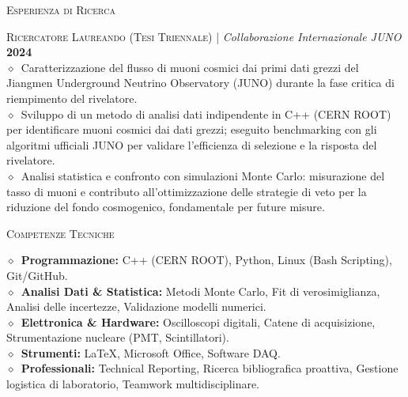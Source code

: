 \documentclass[11pt, a4paper]{article}
\newcommand{\dates}[1]{\hfill\mbox{\textbf{#1}}}
\newcommand{\smaller}[1]{{\small$\diamond$\ #1}}
\newcommand{\headright}[1]{\vspace*{2.5ex}\textsc{\Large\color{cvblue}#1}\par%
     \vspace*{-2ex}{\color{cvblue}\hrulefill}\par}
\begin{document}
\begin{minipage}[t]{0.56\textwidth}
\headright{Esperienza di Ricerca}
\textsc{Ricercatore Laureando (Tesi Triennale)} | \textit{Collaborazione Internazionale JUNO} \dates{2024} \\
\smaller{Caratterizzazione del flusso di muoni cosmici dai primi dati grezzi del Jiangmen Underground Neutrino Observatory (JUNO) durante la fase critica di riempimento del rivelatore.}\\
\smaller{Sviluppo di un metodo di analisi dati indipendente in C++ (CERN ROOT) per identificare muoni cosmici dai dati grezzi; eseguito benchmarking con gli algoritmi ufficiali JUNO per validare l'efficienza di selezione e la risposta del rivelatore.}\\
\smaller{Analisi statistica e confronto con simulazioni Monte Carlo: misurazione del tasso di muoni e contributo all'ottimizzazione delle strategie di veto per la riduzione del fondo cosmogenico, fondamentale per future misure.}

\headright{Competenze Tecniche}

\smaller{\textbf{Programmazione:} C++ (CERN ROOT), Python, Linux (Bash Scripting), Git/GitHub.} \\
\smaller{\textbf{Analisi Dati \& Statistica:} Metodi Monte Carlo, Fit di verosimiglianza, Analisi delle incertezze, Validazione modelli numerici.} \\
\smaller{\textbf{Elettronica \& Hardware:} Oscilloscopi digitali, Catene di acquisizione, Strumentazione nucleare (PMT, Scintillatori).} \\
\smaller{\textbf{Strumenti:} LaTeX, Microsoft Office, Software DAQ.} \\
\smaller{\textbf{Professionali:} Technical Reporting, Ricerca bibliografica proattiva, Gestione logistica di laboratorio, Teamwork multidisciplinare.}

\end{minipage}
\end{document}
